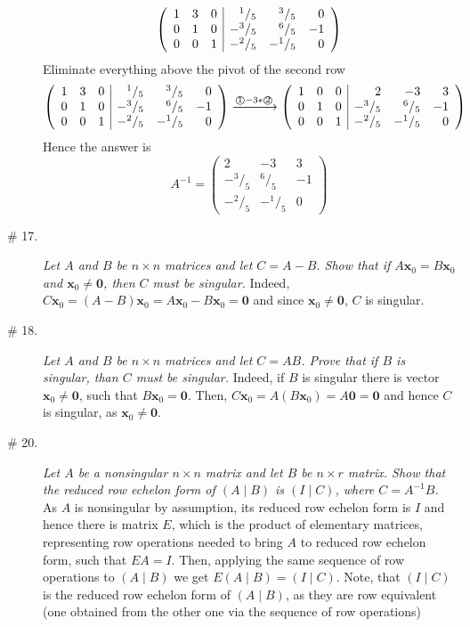 \documentclass[8pt]{article} %
\newcommand{\myexplain}[3]{#1\xrightarrow{\text{#2}}#3}
\newcommand{\myfrac}[2]{^#1/_#2}
\begin{document}
\begin{description}
{\begin{enumerate}[label=(\alph*)]
\[				{\mymat{1&3&0&\myfrac{1}{5}&\myfrac{3}{5}&0\\0&1&0&-\myfrac{3}{5}&\myfrac{6}{5}
				&-1\\0&0&1&-\myfrac{2}{5}&-\myfrac{1}{5}&0}}
				\]
				Eliminate everything above the pivot of the second row
				\[\myexplain
				{\mymat{1&3&0&\myfrac{1}{5}&\myfrac{3}{5}&0\\0&1&0&-\myfrac{3}{5}&\myfrac{6}{5}
				&-1\\0&0&1&-\myfrac{2}{5}&-\myfrac{1}{5}&0}}
				{\textcircled{1}$-3*$\textcircled{2}}
				{\mymat{1&0&0&2&-3&3\\0&1&0&-\myfrac{3}{5}&\myfrac{6}{5}
				&-1\\0&0&1&-\myfrac{2}{5}&-\myfrac{1}{5}&0}}
				\]
				Hence the answer is
				\[A^{-1}=\left(\begin{array}{rrr}2&-3&3\\-\myfrac{3}{5}&\myfrac{6}{5}&-1\\-\myfrac{2}{5}&-\myfrac{1}{5}&0
				\end{array}\right)\]
		\end{enumerate}
			}
	\item[\# 17.]{
		\newcommand{\x}{\mathbf{x}}
		{\it Let $A$ and $B$ be $n\times n$ matrices and let $C=A-B$. Show that if $A\x_0=B\x_0$ and $\x_0\neq\mathbf{0}$,
		then $C$ must be singular.} Indeed, $C\x_0=(A-B)\x_0=A\x_0-B\x_0=\mathbf{0}$ and since $\x_0\neq\mathbf{0}$, $C$ is singular.
			}
	\item[\# 18.]{
		\newcommand{\x}{\mathbf{x}}
		{\it Let $A$ and $B$ be $n\times n$ matrices and let $C=AB$. Prove that if $B$ is singular, than $C$ must be singular.}
		Indeed, if $B$ is singular there is vector $\x_0\neq\mathbf{0}$, such that $B\x_0=\mathbf{0}$. Then, $C\x_0=A(B\x_0)=A\mathbf{0}
		=\mathbf{0}$ and hence $C$ is singular, as $\x_0\neq\mathbf{0}$.
		}
	\item[\# 20.]{
		\newcommand{\x}{\mathbf{x}}
		{\it Let $A$ be a nonsingular $n\times n$ matrix and let $B$ be $n\times r$ matrix. Show that the reduced row echelon form of 
		$(A\mid B)$ is $(I\mid C)$, where $C=A^{-1}B$.}
		As $A$ is nonsingular by assumption, its reduced row echelon form is $I$ and hence there is matrix $E$, which is the product
		of elementary matrices, representing row operations needed to bring $A$ to reduced row echelon form, such that $EA=I$. Then,
		applying the same sequence of row operations to $(A\mid B)$ we get $E(A\mid B)=(I\mid C)$. Note, that $(I\mid C)$ is the reduced
		row echelon form of $(A\mid B)$, as they are row equivalent (one obtained from the other one via the sequence of row operations)
}
\end{description}
\end{document}

